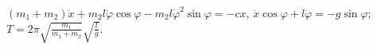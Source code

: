 $(m_1 + m_2)\ddot{x} + m_2l\ddot{\varphi}\cos{\varphi} -
m_2l\dot{\varphi}^2\sin{\varphi} = -cx$,
$\ddot{x}\cos{\varphi} + l\ddot{\varphi} = -g\sin{\varphi}$;
$T = 2\pi\sqrt{\frac{m_1}{m_1 + m_2}}\sqrt{\frac{l}{g}}$.

